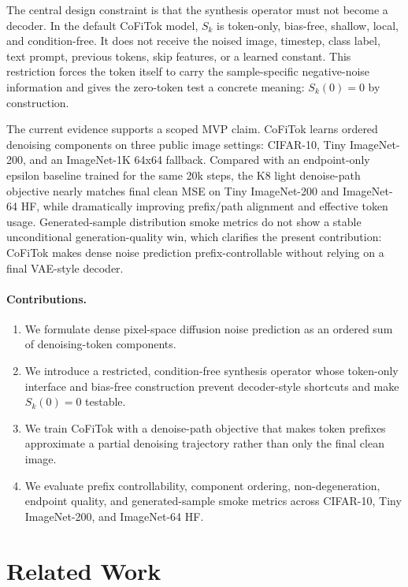 \documentclass[11pt]{article}
\newcommand{\method}{CoFiTok}
\begin{document}
The central design constraint is that the synthesis operator must not become a
decoder. In the default \method{} model, $S_k$ is token-only, bias-free,
shallow, local, and condition-free. It does not receive the noised image,
timestep, class label, text prompt, previous tokens, skip features, or a learned
constant. This restriction forces the token itself to carry the sample-specific
negative-noise information and gives the zero-token test a concrete meaning:
$S_k(0)=0$ by construction.

The current evidence supports a scoped MVP claim. \method{} learns ordered
denoising components on three public image settings: CIFAR-10, Tiny
ImageNet-200, and an ImageNet-1K 64x64 fallback. Compared with an endpoint-only
epsilon baseline trained for the same 20k steps, the K8 light denoise-path
objective nearly matches final clean MSE on Tiny ImageNet-200 and ImageNet-64
HF, while dramatically improving prefix/path alignment and effective token
usage. Generated-sample distribution smoke metrics do not show a stable
unconditional generation-quality win, which clarifies the present contribution:
\method{} makes dense noise prediction prefix-controllable without relying on a
final VAE-style decoder.

\paragraph{Contributions.}
\begin{enumerate}
  \item We formulate dense pixel-space diffusion noise prediction as an ordered
  sum of denoising-token components.
  \item We introduce a restricted, condition-free synthesis operator whose
  token-only interface and bias-free construction prevent decoder-style
  shortcuts and make $S_k(0)=0$ testable.
  \item We train \method{} with a denoise-path objective that makes token
  prefixes approximate a partial denoising trajectory rather than only the final
  clean image.
  \item We evaluate prefix controllability, component ordering,
  non-degeneration, endpoint quality, and generated-sample smoke metrics across
  CIFAR-10, Tiny ImageNet-200, and ImageNet-64 HF.
\end{enumerate}

\section{Related Work}
\end{document}
